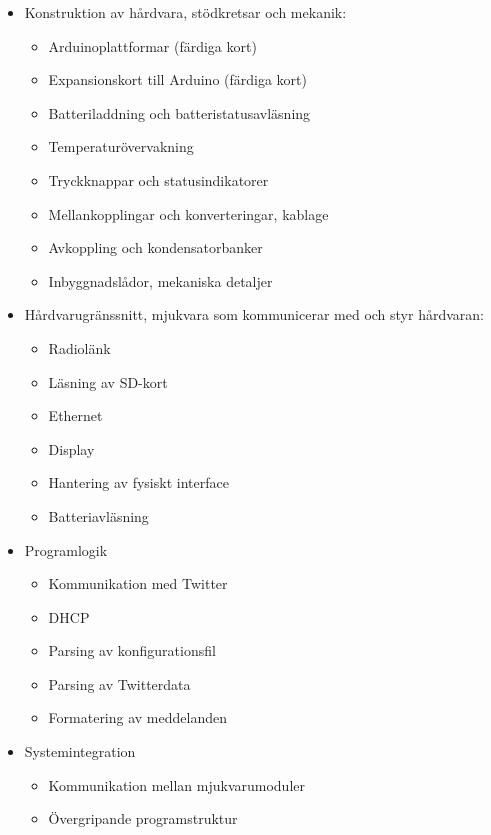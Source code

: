 \documentclass[a4paper,11pt]{article}
\begin{document}
	\begin{itemize}
	\item Konstruktion av hårdvara, stödkretsar och mekanik:
		\begin{itemize}
        	\item Arduinoplattformar (färdiga kort)
        	\item Expansionskort till Arduino (färdiga kort)
        	\item Batteriladdning och batteristatusavläsning
        	\item Temperaturövervakning
        	\item Tryckknappar och statusindikatorer
        	\item Mellankopplingar och konverteringar, kablage
            \item Avkoppling och kondensatorbanker
        	\item Inbyggnadslådor, mekaniska detaljer
        	\end{itemize}	
    	\item Hårdvarugränssnitt, mjukvara som kommunicerar med och styr hårdvaran:
    		\begin{itemize}
        	\item Radiolänk
        	\item Läsning av SD-kort
        	\item Ethernet
        	\item Display
            \item Hantering av fysiskt interface
            \item Batteriavläsning
        	\end{itemize}
    	\item Programlogik
    		\begin{itemize}
        	\item Kommunikation med Twitter
        	\item DHCP
        	\item Parsing av konfigurationsfil
        	\item Parsing av Twitterdata
        	\item Formatering av meddelanden
        	\end{itemize}
    	\item Systemintegration
    		\begin{itemize}
        	\item Kommunikation mellan mjukvarumoduler
        	\item Övergripande programstruktur
        	\end{itemize}
	\end{itemize}	
\end{document}
